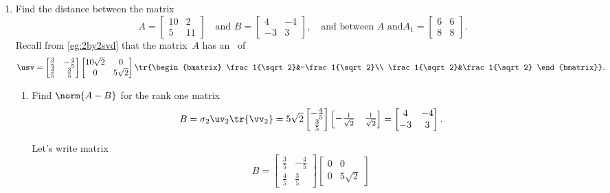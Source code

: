 \begin{example}
\begin{enumerate}
\item Find the distance between the matrix
\begin{equation*}
A=\begin{bmatrix} 10&2\\5&11 \end{bmatrix}
\quad\text{and }B=\begin{bmatrix} 4&-4\\-3&3 \end{bmatrix},
\quad\text{and between $A$ and} A_1=\begin{bmatrix} 6&6\\8&8 \end{bmatrix}.
\end{equation*}
Recall from \cref{eg:2by2svd} that the matrix~\(A\) has an \svd\ of
\begin{equation*}
\usv=\begin{bmatrix} \frac35&-\frac45\\\frac45&\frac35 \end{bmatrix}
\begin{bmatrix} 10\sqrt2&0\\0&5\sqrt2 \end{bmatrix}
\tr{\begin{bmatrix} \frac1{\sqrt2}&-\frac1{\sqrt2}\\ \frac1{\sqrt2}&\frac1{\sqrt2} \end{bmatrix}}.
\end{equation*}
\begin{enumerate}
\item Find \(\norm{A-B}\) for the rank one matrix 
\begin{equation*}
B=\sigma_2\uv_2\tr{\vv_2}
=5\sqrt2\begin{bmatrix} -\frac45\\\frac35 \end{bmatrix}
\begin{bmatrix} -\frac1{\sqrt2}&\frac1{\sqrt2} \end{bmatrix}
=\begin{bmatrix} 4&-4\\-3&3 \end{bmatrix}.
\end{equation*}
\begin{solution} 
Let's write matrix
\begin{equation*}
B=\begin{bmatrix} \frac35&-\frac45\\\frac45&\frac35 \end{bmatrix}
\begin{bmatrix} 0&0\\0&5\sqrt2 \end{bmatrix}

\end{equation*}
\end{solution}
\end{enumerate}
\end{enumerate}
\end{example}
